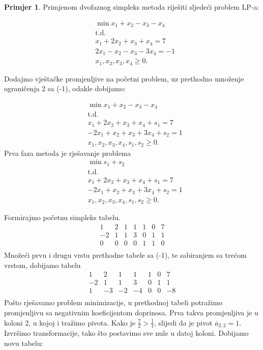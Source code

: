 \documentclass[b5paper, utf8, 11pt, colorlinks]{book}
\theoremstyle{definition}
\newtheorem{primjer}{Primjer}[chapter]
\begin{document}


\begin{primjer} Primjenom dvofaznog simpleks metoda riješiti sljedeći problem LP-a:
\end{primjer} 

\begin{align*}
	&\min x_1 + x_2 - x_3 - x_4 \\
	& {\mbox{t.d.}} \\
	&x_1 + 2x_2 + x_3 + x_4 = 7 \\
	& 2x_1 - x_2 - x_3 - 3x_4 = -1 \\
	& x_1,x_2,x_3,x_4 \geq 0.
\end{align*}

Dodajmo vještačke promjenljive na početni problem, uz prethodno množenje ograničenja 2 sa (-1), odakle dobijamo:

\begin{align*}
	&\min x_1 + x_2 - x_3 - x_4 \\
	&\mbox{t.d.} \\
	&x_1 + 2x_2 + x_3 + x_4 + s_1 = 7 \\
	& -2x_1 + x_2 + x_3 + 3x_4 + s_2 =  1 \\
	& x_1,x_2,x_3,x_4, s_1, s_2\geq 0.
\end{align*}
Prva faza metoda je rješavanje problema 
\begin{align*}
	&\min s_1 + s_2 \\
	&  {\mbox{t.d.}}\\
	& x_1 + 2x_2 + x_3 + x_4 + s_1 = 7 \\
	& -2x_1 + x_2 + x_3 + 3x_4 + s_2 = 1 \\
	& x_1,x_2,x_3,x_4, s_1, s_2\geq 0.
\end{align*}


Formirajmo početnu simpleks tabelu.
$$\begin{array}{cccccc|c}
	1 & 2 & 1 & 1 & 1 &  0 & 7  \\
	-2 & 1 & 1 & 3 & 0 &  1 & 1  \\ \hline
	0 & 0 & 0 & 0 & 1 & 1 &  0  \\
\end{array}
$$
Množeći prvu i drugu vrstu prethodne tabele sa (-1), te sabiranjem sa trećom vrstom, dobijamo tabelu
$$\begin{array}{cccccc|c}
	1 & 2 & 1 & 1 & 1 & 0 & 7 \\
	-2&1  & 1 & 3 & 0 & 1 & 1 \\ \hline
	1 & -3 & -2 & -4 & 0 & 0 & -8 \\ 
\end{array}
$$
Pošto rješavamo problem minimizacije, u prethodnoj tabeli potražimo promjenljivu 
sa negativnim koeficijentom doprinosa. Prva takva promjenljiva je u koloni 2, u kojoj 
i tražimo pivota.  Kako je $\frac{7}{2} > \frac{1}{1}$, slijedi da je 
pivot $\overline{a}_{2,2} = 1$. Izvršimo transformacije, tako što postavimo sve nule u datoj koloni. Dobijamo novu tabelu:
\end{document}

